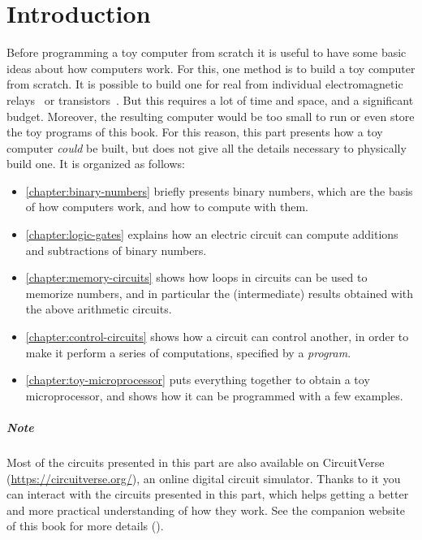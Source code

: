 
\chapter*{Introduction}

Before programming a toy computer from scratch it is useful to have some basic
ideas about how computers work. For this, one method is to build a toy computer
from scratch. It is possible to build one for real from individual
electromagnetic relays~\cite{MerciaRelay} or transistors~\cite{Megaprocessor}.
But this requires a lot of time and space, and a significant budget. Moreover,
the resulting computer would be too small to run or even store the toy programs
of this book. For this reason, this part presents how a toy computer {\em
could} be built, but does not give all the details necessary to physically
build one. It is organized as follows:
\begin{itemize}
  \item \cref{chapter:binary-numbers} briefly presents binary numbers, which
  are the basis of how computers work, and how to compute with them.

  \item \cref{chapter:logic-gates} explains how an electric circuit can compute
  additions and subtractions of binary numbers.

  \item \cref{chapter:memory-circuits} shows how loops in circuits can be used
  to memorize numbers, and in particular the (intermediate) results obtained
  with the above arithmetic circuits.

  \item \cref{chapter:control-circuits} shows how a circuit can control
  another, in order to make it perform a series of computations, specified by a
  {\em program}.

  \item \cref{chapter:toy-microprocessor} puts everything together to obtain a
  toy microprocessor, and shows how it can be programmed with a few examples.
\end{itemize}

\paragraph{Note} Most of the circuits presented in this part are also available
on CircuitVerse (\url{https://circuitverse.org/}), an online digital circuit
simulator. Thanks to it you can interact with the circuits presented in this
part, which helps getting a better and more practical understanding of how they
work. See the companion website of this book for more details (\toypcurl{}).
